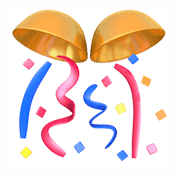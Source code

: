 \documentclass{article}
\begin{document}
\begin{center}
\begin{figure}[h]
\begin{minipage}[h]{0.1\linewidth}
		\end{minipage}
		\begin{minipage}[h]{0.1\linewidth}
		\end{minipage}
		\begin{minipage}[h]{0.4\linewidth}
			\includegraphics[width=0.25\linewidth]{img2.png}
		\end{minipage}
	\end{figure}
\end{center}

\end{document}
